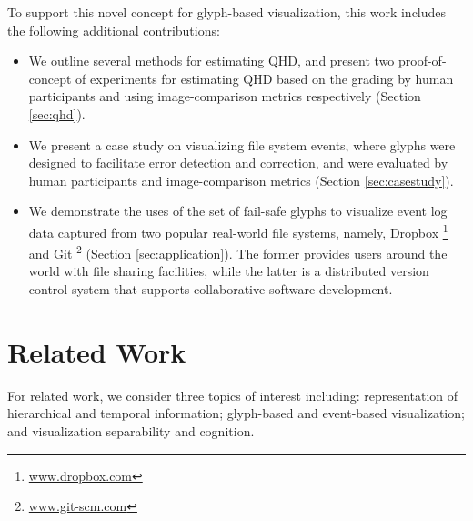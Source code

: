 To support this novel concept for glyph-based visualization, this work includes the following additional contributions:  
%
\begin{itemize}
\vspace{-2mm}
\item
We outline several methods for estimating QHD, and present two proof-of-concept of experiments for estimating QHD based on the grading by human participants and using image-comparison metrics respectively (Section \ref{sec:qhd}).
\vspace{-2mm}
\item
We present a case study on visualizing file system events, where glyphs were designed to facilitate error detection and correction, and were evaluated by human participants and image-comparison metrics (Section \ref{sec:casestudy}).
\vspace{-2mm}
\item
We demonstrate the uses of the set of fail-safe glyphs to visualize event log data captured from two popular real-world file systems, namely, Dropbox \footnote{\url{www.dropbox.com}} and Git \footnote{\url{www.git-scm.com}} (Section \ref{sec:application}).
The former provides users around the world with file sharing facilities, while the latter is a distributed version control system that supports collaborative software development.
\end{itemize}

\section{Related Work}
\label{sec:relatedworks}

For related work, we consider three topics of interest including: representation of hierarchical and temporal information; glyph-based and event-based visualization; and visualization separability and cognition.

